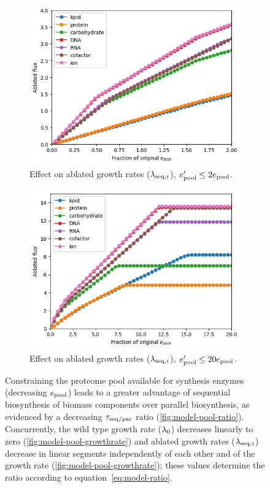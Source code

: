 \begin{figure}
  \begin{subfigure}[htpb]{0.45\textwidth}
   \centering
   \includegraphics[width=\textwidth]{epool_ec_components}
   \caption{
     Effect on ablated growth rates ($\lambda_{\mathrm{seq},i}$), $e_{\mathrm{pool}}^{\prime} \leq 2e_{\mathrm{pool}}$.
   }
   \label{fig:model-pool-ablated}
  \end{subfigure}%
  \begin{subfigure}[htpb]{0.45\textwidth}
   \centering
   \includegraphics[width=\textwidth]{epool_ec_components_20}
   \caption{
     Effect on ablated growth rates ($\lambda_{\mathrm{seq},i}$), $e_{\mathrm{pool}}^{\prime} \leq 20e_{\mathrm{pool}}$.
   }
   \label{fig:model-pool-ablated-20}
  \end{subfigure}

  \caption{
    Constraining the proteome pool available for synthesis enzymes (decreasing $e_{\mathrm{pool}}$) leads to a greater advantage of sequential biosynthesis of biomass components over parallel biosynthesis, as evidenced by a decreasing $\tau_{\mathrm{seq}/\mathrm{par}}$ ratio (\ref{fig:model-pool-ratio}).
    Concurrently, the wild type growth rate ($\lambda_{0}$) decreases linearly to zero (\ref{fig:model-pool-growthrate}) and ablated growth rates ($\lambda_{\mathrm{seq},i}$) decrease in linear segments independently of each other and of the growth rate (\ref{fig:model-pool-growthrate}); these values determine the ratio according to equation~\ref{eq:model-ratio}.
  }
  \label{fig:model-pool}
\end{figure}


